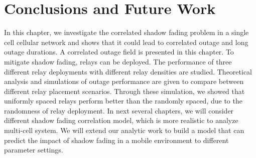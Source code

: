 \section{Conclusions and Future Work}
\label{sec:Conclusions}
In this chapter, we investigate the correlated shadow fading problem in a single cell cellular network and shows that it could lead to correlated outage and long outage durations. A correlated outage field is presented in this chapter. To mitigate shadow fading, relays can be deployed. The performance of three different relay deployments with different relay densities are studied. Theoretical analysis and simulations of outage performance are given to compare between different relay placement scenarios. Through these simulation, we showed that uniformly spaced relays perform better than the randomly spaced, due to the randomness of relay deployment. In next several chapters, we will consider different shadow fading correlation model, which is more realistic to analyze multi-cell system. We will extend our analytic work to build a model that can predict the impact of shadow fading in a mobile environment to different parameter settings.






